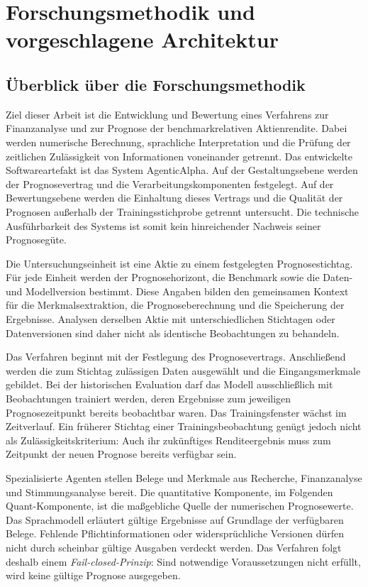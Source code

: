 \chapter{Forschungsmethodik und vorgeschlagene Architektur}
\label{ch:method}

\section{Überblick über die Forschungsmethodik}
\label{sec:research-method}
Ziel dieser Arbeit ist die Entwicklung und Bewertung eines Verfahrens zur Finanzanalyse und zur Prognose der benchmarkrelativen Aktienrendite. Dabei werden numerische Berechnung, sprachliche Interpretation und die Prüfung der zeitlichen Zulässigkeit von Informationen voneinander getrennt. Das entwickelte Softwareartefakt ist das System AgenticAlpha. Auf der Gestaltungsebene werden der Prognosevertrag und die Verarbeitungskomponenten festgelegt. Auf der Bewertungsebene werden die Einhaltung dieses Vertrags und die Qualität der Prognosen außerhalb der Trainingsstichprobe getrennt untersucht. Die technische Ausführbarkeit des Systems ist somit kein hinreichender Nachweis seiner Prognosegüte.

Die Untersuchungseinheit ist eine Aktie zu einem festgelegten Prognosestichtag. Für jede Einheit werden der Prognosehorizont, die Benchmark sowie die Daten- und Modellversion bestimmt. Diese Angaben bilden den gemeinsamen Kontext für die Merkmalsextraktion, die Prognoseberechnung und die Speicherung der Ergebnisse. Analysen derselben Aktie mit unterschiedlichen Stichtagen oder Datenversionen sind daher nicht als identische Beobachtungen zu behandeln.

Das Verfahren beginnt mit der Festlegung des Prognosevertrags. Anschließend werden die zum Stichtag zulässigen Daten ausgewählt und die Eingangsmerkmale gebildet. Bei der historischen Evaluation darf das Modell ausschließlich mit Beobachtungen trainiert werden, deren Ergebnisse zum jeweiligen Prognosezeitpunkt bereits beobachtbar waren. Das Trainingsfenster wächst im Zeitverlauf. Ein früherer Stichtag einer Trainingsbeobachtung genügt jedoch nicht als Zulässigkeitskriterium: Auch ihr zukünftiges Renditeergebnis muss zum Zeitpunkt der neuen Prognose bereits verfügbar sein.

Spezialisierte Agenten stellen Belege und Merkmale aus Recherche, Finanzanalyse und Stimmungsanalyse bereit. Die quantitative Komponente, im Folgenden Quant-Komponente, ist die maßgebliche Quelle der numerischen Prognosewerte. Das Sprachmodell erläutert gültige Ergebnisse auf Grundlage der verfügbaren Belege. Fehlende Pflichtinformationen oder widersprüchliche Versionen dürfen nicht durch scheinbar gültige Ausgaben verdeckt werden. Das Verfahren folgt deshalb einem \emph{Fail-closed-Prinzip}: Sind notwendige Voraussetzungen nicht erfüllt, wird keine gültige Prognose ausgegeben.

